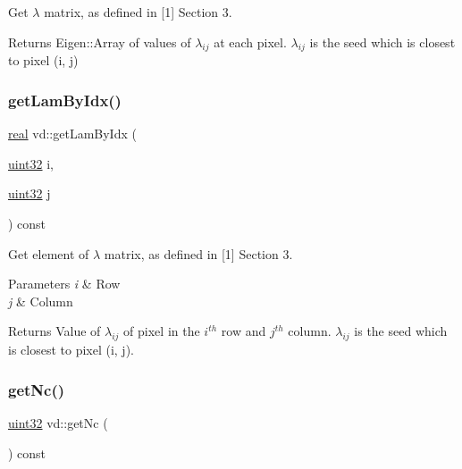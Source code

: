 Get $\lambda$ matrix, as defined in \mbox{[}1\mbox{]} Section 3. 

\begin{DoxyReturn}{Returns}
Eigen\+::\+Array of values of $\lambda_{ij}$ at each pixel. $\lambda_{ij}$ is the seed which is closest to pixel (i, j) 
\end{DoxyReturn}
\mbox{\label{classvd_a5c26b069f893aa82eeaf53ff608eda1f}} 
\subsubsection{\texorpdfstring{get\+Lam\+By\+Idx()}{getLamByIdx()}}
{\footnotesize\ttfamily \mbox{\hyperlink{typedefs_8h_a58a0c7cf2501f4492da833421be92547}{real}} vd\+::get\+Lam\+By\+Idx (\begin{DoxyParamCaption}\item[{\mbox{\hyperlink{typedefs_8h_a8ad23e2333787a214e20a58a284a5a60}{uint32}}}]{i,  }\item[{\mbox{\hyperlink{typedefs_8h_a8ad23e2333787a214e20a58a284a5a60}{uint32}}}]{j }\end{DoxyParamCaption}) const}



Get element of $\lambda$ matrix, as defined in \mbox{[}1\mbox{]} Section 3. 


\begin{DoxyParams}{Parameters}
{\em i} & Row \\
\hline
{\em j} & Column \\
\hline
\end{DoxyParams}
\begin{DoxyReturn}{Returns}
Value of $\lambda_{ij}$ of pixel in the $ i^{th} $ row and $ j^{th} $ column. $\lambda_{ij}$ is the seed which is closest to pixel (i, j). 
\end{DoxyReturn}
\mbox{\label{classvd_a555fdcee74959a18003dd992a4c57cef}} 
\subsubsection{\texorpdfstring{get\+Nc()}{getNc()}}
{\footnotesize\ttfamily \mbox{\hyperlink{typedefs_8h_a8ad23e2333787a214e20a58a284a5a60}{uint32}} vd\+::get\+Nc (\begin{DoxyParamCaption}{ }\end{DoxyParamCaption}) const}



